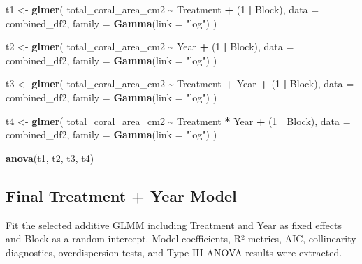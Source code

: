 \documentclass[
]{article}
\newenvironment{Shaded}{\begin{snugshade}}{\end{snugshade}}
\newcommand{\AttributeTok}[1]{\textcolor[rgb]{0.13,0.29,0.53}{#1}}
\newcommand{\DecValTok}[1]{\textcolor[rgb]{0.00,0.00,0.81}{#1}}
\newcommand{\FunctionTok}[1]{\textcolor[rgb]{0.13,0.29,0.53}{\textbf{#1}}}
\newcommand{\NormalTok}[1]{#1}
\newcommand{\OtherTok}[1]{\textcolor[rgb]{0.56,0.35,0.01}{#1}}
\newcommand{\SpecialCharTok}[1]{\textcolor[rgb]{0.81,0.36,0.00}{\textbf{#1}}}
\newcommand{\StringTok}[1]{\textcolor[rgb]{0.31,0.60,0.02}{#1}}
\begin{document}
\begin{Shaded}
\begin{Highlighting}[]
\NormalTok{t1 }\OtherTok{\textless{}{-}} \FunctionTok{glmer}\NormalTok{(}
\NormalTok{  total\_coral\_area\_cm2 }\SpecialCharTok{\textasciitilde{}}\NormalTok{ Treatment }\SpecialCharTok{+}\NormalTok{ (}\DecValTok{1} \SpecialCharTok{|}\NormalTok{ Block),}
  \AttributeTok{data =}\NormalTok{ combined\_df2,}
  \AttributeTok{family =} \FunctionTok{Gamma}\NormalTok{(}\AttributeTok{link =} \StringTok{"log"}\NormalTok{)}
\NormalTok{)}

\NormalTok{t2 }\OtherTok{\textless{}{-}} \FunctionTok{glmer}\NormalTok{(}
\NormalTok{  total\_coral\_area\_cm2 }\SpecialCharTok{\textasciitilde{}}\NormalTok{ Year }\SpecialCharTok{+}\NormalTok{ (}\DecValTok{1} \SpecialCharTok{|}\NormalTok{ Block),}
  \AttributeTok{data =}\NormalTok{ combined\_df2,}
  \AttributeTok{family =} \FunctionTok{Gamma}\NormalTok{(}\AttributeTok{link =} \StringTok{"log"}\NormalTok{)}
\NormalTok{)}

\NormalTok{t3 }\OtherTok{\textless{}{-}} \FunctionTok{glmer}\NormalTok{(}
\NormalTok{  total\_coral\_area\_cm2 }\SpecialCharTok{\textasciitilde{}}\NormalTok{ Treatment }\SpecialCharTok{+}\NormalTok{ Year }\SpecialCharTok{+}\NormalTok{ (}\DecValTok{1} \SpecialCharTok{|}\NormalTok{ Block),}
  \AttributeTok{data =}\NormalTok{ combined\_df2,}
  \AttributeTok{family =} \FunctionTok{Gamma}\NormalTok{(}\AttributeTok{link =} \StringTok{"log"}\NormalTok{)}
\NormalTok{)}

\NormalTok{t4 }\OtherTok{\textless{}{-}} \FunctionTok{glmer}\NormalTok{(}
\NormalTok{  total\_coral\_area\_cm2 }\SpecialCharTok{\textasciitilde{}}\NormalTok{ Treatment }\SpecialCharTok{*}\NormalTok{ Year }\SpecialCharTok{+}\NormalTok{ (}\DecValTok{1} \SpecialCharTok{|}\NormalTok{ Block),}
  \AttributeTok{data =}\NormalTok{ combined\_df2,}
  \AttributeTok{family =} \FunctionTok{Gamma}\NormalTok{(}\AttributeTok{link =} \StringTok{"log"}\NormalTok{)}
\NormalTok{)}

\FunctionTok{anova}\NormalTok{(t1, t2, t3, t4)}
\end{Highlighting}
\end{Shaded}

\subsection{Final Treatment + Year
Model}\label{final-treatment-year-model}

Fit the selected additive GLMM including Treatment and Year as fixed
effects and Block as a random intercept. Model coefficients, R² metrics,
AIC, collinearity diagnostics, overdispersion tests, and Type III ANOVA
results were extracted.
\end{document}
